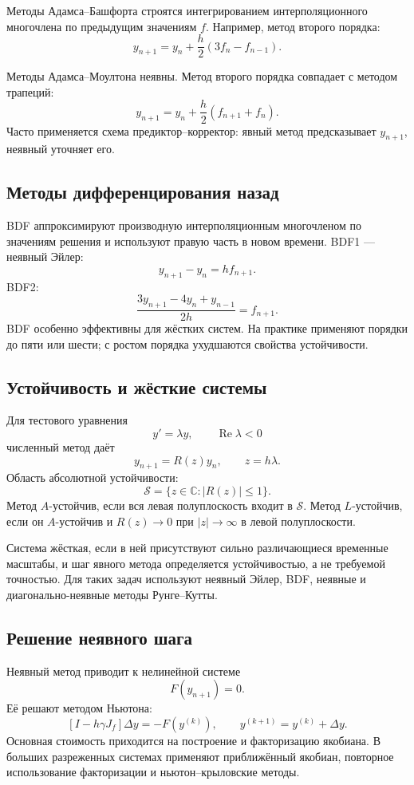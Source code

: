 Методы Адамса--Башфорта строятся интегрированием интерполяционного многочлена по
предыдущим значениям $f$. Например, метод второго порядка:
\[
    y_{n+1}=y_n+\frac h2(3f_n-f_{n-1}).
\]

Методы Адамса--Моултона неявны. Метод второго порядка совпадает с методом
трапеций:
\[
    y_{n+1}=y_n+\frac h2(f_{n+1}+f_n).
\]
Часто применяется схема предиктор--корректор: явный метод предсказывает
$y_{n+1}$, неявный уточняет его.

\subsection{Методы дифференцирования назад}

BDF аппроксимируют производную интерполяционным многочленом по значениям решения
и используют правую часть в новом времени. BDF1 --- неявный Эйлер:
\[
    y_{n+1}-y_n=hf_{n+1}.
\]
BDF2:
\[
    \frac{3y_{n+1}-4y_n+y_{n-1}}{2h}=f_{n+1}.
\]
BDF особенно эффективны для жёстких систем. На практике применяют порядки до
пяти или шести; с ростом порядка ухудшаются свойства устойчивости.

\subsection{Устойчивость и жёсткие системы}

Для тестового уравнения
\[
    y'=\lambda y,
    \qquad \operatorname{Re}\lambda<0
\]
численный метод даёт
\[
    y_{n+1}=R(z)y_n,
    \qquad z=h\lambda.
\]
Область абсолютной устойчивости:
\[
    \mathcal S=\{z\in\mathbb C:|R(z)|\leq1\}.
\]
Метод $A$-устойчив, если вся левая полуплоскость входит в $\mathcal S$.
Метод $L$-устойчив, если он $A$-устойчив и $R(z)\to0$ при $|z|\to\infty$ в левой
полуплоскости.

Система жёсткая, если в ней присутствуют сильно различающиеся временные масштабы,
и шаг явного метода определяется устойчивостью, а не требуемой точностью.
Для таких задач используют неявный Эйлер, BDF, неявные и диагонально-неявные
методы Рунге--Кутты.

\subsection{Решение неявного шага}

Неявный метод приводит к нелинейной системе
\[
    F(y_{n+1})=0.
\]
Её решают методом Ньютона:
\[
    \left[I-h\gamma J_f\right]\Delta y=-F(y^{(k)}),
    \qquad
    y^{(k+1)}=y^{(k)}+\Delta y.
\]
Основная стоимость приходится на построение и факторизацию якобиана. В больших
разреженных системах применяют приближённый якобиан, повторное использование
факторизации и ньютон--крыловские методы.

